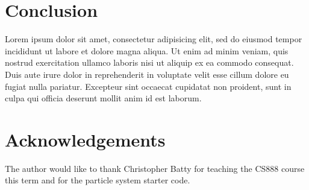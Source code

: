 \documentclass[tog]{acmsiggraph}
\begin{document}
\section{Conclusion}

Lorem ipsum dolor sit amet, consectetur adipisicing elit, sed do
eiusmod tempor incididunt ut labore et dolore magna aliqua. Ut enim ad
minim veniam, quis nostrud exercitation ullamco laboris nisi ut
aliquip ex ea commodo consequat. Duis aute irure dolor in
reprehenderit in voluptate velit esse cillum dolore eu fugiat nulla
pariatur. Excepteur sint occaecat cupidatat non proident, sunt in
culpa qui officia deserunt mollit anim id est laborum.

\section*{Acknowledgements}

The author would like to thank Christopher Batty for teaching the CS888 course this term and for the particle system starter code.




\end{document}
